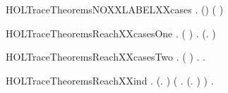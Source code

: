 \newcommand{\HOLTraceTheoremsMOREXXNODES}{\UseVerbatim{HOLTraceTheoremsMOREXXNODES}}
\begin{SaveVerbatim}{HOLTraceTheoremsNOXXLABELXXcases}
\HOLTokenTurnstile{} \HOLSymConst{\HOLTokenForall{}} .  (\HOLSymConst{::}) \HOLSymConst{\HOLTokenEquiv{}} ( \HOLSymConst{=} \HOLConst{\ensuremath{\tau}}) \HOLSymConst{\HOLTokenConj{}}  
\end{SaveVerbatim}
\newcommand{\HOLTraceTheoremsNOXXLABELXXcases}{\UseVerbatim{HOLTraceTheoremsNOXXLABELXXcases}}
\begin{SaveVerbatim}{HOLTraceTheoremsReachXXcasesOne}
\HOLTokenTurnstile{} \HOLSymConst{\HOLTokenForall{}} .    \HOLSymConst{\HOLTokenEquiv{}} ( \HOLSymConst{=} ) \HOLSymConst{\HOLTokenDisj{}} \HOLSymConst{\HOLTokenExists{}}. (\HOLSymConst{\HOLTokenExists{}}.  \HOLTokenTransBegin{}\HOLTokenTransEnd {}) \HOLSymConst{\HOLTokenConj{}}   
\end{SaveVerbatim}
\newcommand{\HOLTraceTheoremsReachXXcasesOne}{\UseVerbatim{HOLTraceTheoremsReachXXcasesOne}}
\begin{SaveVerbatim}{HOLTraceTheoremsReachXXcasesTwo}
\HOLTokenTurnstile{} \HOLSymConst{\HOLTokenForall{}} .    \HOLSymConst{\HOLTokenEquiv{}} ( \HOLSymConst{=} ) \HOLSymConst{\HOLTokenDisj{}} \HOLSymConst{\HOLTokenExists{}}.    \HOLSymConst{\HOLTokenConj{}} \HOLSymConst{\HOLTokenExists{}}.  \HOLTokenTransBegin{}\HOLTokenTransEnd {}
\end{SaveVerbatim}
\newcommand{\HOLTraceTheoremsReachXXcasesTwo}{\UseVerbatim{HOLTraceTheoremsReachXXcasesTwo}}
\begin{SaveVerbatim}{HOLTraceTheoremsReachXXind}
\HOLTokenTurnstile{} \HOLSymConst{\HOLTokenForall{}}.
       (\HOLSymConst{\HOLTokenForall{}}.   ) \HOLSymConst{\HOLTokenConj{}} (\HOLSymConst{\HOLTokenForall{}}  . (\HOLSymConst{\HOLTokenExists{}}.  \HOLTokenTransBegin{}\HOLTokenTransEnd {}) \HOLSymConst{\HOLTokenConj{}}    \HOLSymConst{\HOLTokenImp{}}   ) \HOLSymConst{\HOLTokenImp{}}
       \HOLSymConst{\HOLTokenForall{}} .    \HOLSymConst{\HOLTokenImp{}}   
\end{SaveVerbatim}
